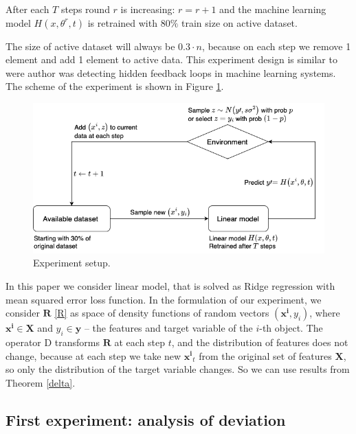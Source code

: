 \documentclass{article}
\begin{document}
        After each $T$ steps round $r$ is increasing: $r = r+1$ and the machine learning model $H(x, \theta^r, t)$ is retrained with $80\%$ train size on active dataset. 

        The size of active dataset will always be $0.3 \cdot n$, because on each step we remove 1 element and add 1 element to active data. This experiment design is similar to \cite{khritankov2021hidden} were author was detecting hidden feedback loops in machine learning systems. The scheme of the experiment is shown in Figure \ref{ex_set}.

        \begin{figure}[h!]
            \centering
            \includegraphics[scale = 0.5]{pictures/Experiment_setup.png}
            \caption{Experiment setup.}
            \label{ex_set}
        \end{figure}

        In this paper we consider linear model, that is solved as Ridge regression with mean squared error loss function. In the formulation of our experiment, we consider $\mathbf{R}$ \eqref{R} as space of density functions of random vectors $(\mathbf{x^i}, y_i)$, where $\mathbf{x^i} \in \textbf{X}$ and $y_i \in \textbf{y}$ -- the features and target variable of the $i$-th object. The operator $\text{D}$ transforms $\mathbf{R}$ at each step $t$, and the distribution of features does not change, because at each step we take new $\mathbf{x^i}_t$ from the original set of features $\textbf{X}$, so only the distribution of the target variable changes. So we can use results from Theorem \ref{delta}. 

    \subsection{First experiment: analysis of deviation} \label{exp_1}
\end{document}
